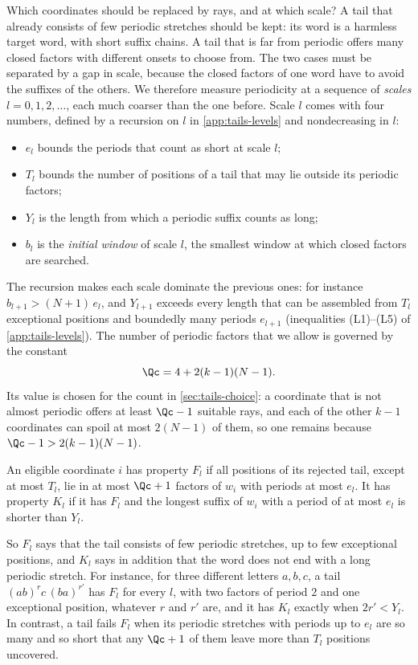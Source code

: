 

Which coordinates should be replaced by rays, and at which scale? A tail
that already consists of few periodic stretches should be kept: its word is
a harmless target word, with short suffix chains. A tail that is far from
periodic offers many closed factors with different onsets to choose from.
The two cases must be separated by a gap in scale, because the closed
factors of one word have to avoid the suffixes of the others. We therefore
measure periodicity at a sequence of \emph{scales} $l=0,1,2,\dots$, each
much coarser than the one before. Scale $l$ comes with four numbers, defined
by a recursion on $l$ in \cref{app:tails-levels} and nondecreasing in $l$:
\begin{itemize}
\item $e_l$ bounds the periods that count as short at scale $l$;
\item $T_l$ bounds the number of positions of a tail that may lie outside
  its periodic factors;
\item $Y_l$ is the length from which a periodic suffix counts as long;
\item $b_l$ is the \emph{initial window} of scale $l$, the smallest window
  at which closed factors are searched.
\end{itemize}
The recursion makes each scale dominate the previous ones: for instance
$b_{l+1}>(N+1)\,e_l$, and $Y_{l+1}$ exceeds every length that can be
assembled from $T_l$ exceptional positions and boundedly many periods
$e_{l+1}$ (inequalities (L1)--(L5) of \cref{app:tails-levels}). The number
of periodic factors that we allow is governed by the constant
\[
  \Qc=4+2(k-1)(N-1).
\]
Its value is chosen for the count in \cref{sec:tails-choice}: a coordinate that
is not almost periodic offers at least $\Qc-1$ suitable rays, and each of
the other $k-1$ coordinates can spoil at most $2(N-1)$ of them, so one
remains because $\Qc-1>2(k-1)(N-1)$.

\begin{definition}\label{def:cover}
An eligible coordinate $i$ has property $F_l$ if all positions of its
rejected tail, except at most $T_l$, lie in at most $\Qc+1$ factors of $w_i$
with periods at most $e_l$. It has property $K_l$ if it has $F_l$ and the
longest suffix of $w_i$ with a period of at most $e_l$ is shorter than
$Y_l$.
\end{definition}

So $F_l$ says that the tail consists of few periodic stretches, up to few
exceptional positions, and $K_l$ says in addition that the word does not
end with a long periodic stretch. For instance, for three different
letters $a,b,c$, a tail $(ab)^{r}c\,(ba)^{r'}$ has $F_l$ for every $l$, with
two factors of period $2$ and one exceptional position, whatever $r$ and
$r'$ are, and it has $K_l$ exactly when $2r'<Y_l$. In contrast, a tail
fails $F_l$ when its periodic stretches with periods up to $e_l$ are so
many and so short that any $\Qc+1$ of them leave more than $T_l$ positions
uncovered.

